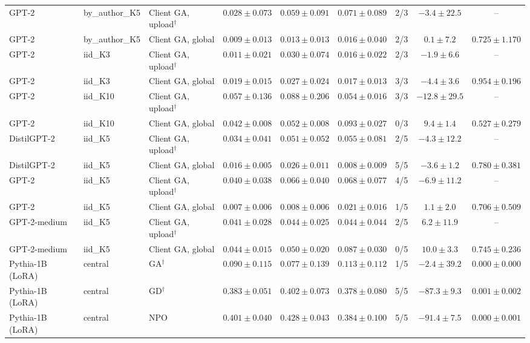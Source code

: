 \begin{table}[t]
\begin{tabular*}{\textwidth}{@{\extracolsep{\fill}}lllcccccc@{}}
GPT-2 & by\_author\_K5 & Client GA, upload$^{\dagger}$ & $0.028 \pm 0.073$ & $0.059 \pm 0.091$ & $0.071 \pm 0.089$ & 2/3 & $-3.4 \pm 22.5$ & -- \\
GPT-2 & by\_author\_K5 & Client GA, global & $0.009 \pm 0.013$ & $0.013 \pm 0.013$ & $0.016 \pm 0.040$ & 2/3 & $0.1 \pm 7.2$ & $0.725 \pm 1.170$ \\
GPT-2 & iid\_K3 & Client GA, upload$^{\dagger}$ & $0.011 \pm 0.021$ & $0.030 \pm 0.074$ & $0.016 \pm 0.022$ & 2/3 & $-1.9 \pm 6.6$ & -- \\
GPT-2 & iid\_K3 & Client GA, global & $0.019 \pm 0.015$ & $0.027 \pm 0.024$ & $0.017 \pm 0.013$ & 3/3 & $-4.4 \pm 3.6$ & $0.954 \pm 0.196$ \\
GPT-2 & iid\_K10 & Client GA, upload$^{\dagger}$ & $0.057 \pm 0.136$ & $0.088 \pm 0.206$ & $0.054 \pm 0.016$ & 3/3 & $-12.8 \pm 29.5$ & -- \\
GPT-2 & iid\_K10 & Client GA, global & $0.042 \pm 0.008$ & $0.052 \pm 0.008$ & $0.093 \pm 0.027$ & 0/3 & $9.4 \pm 1.4$ & $0.527 \pm 0.279$ \\
DistilGPT-2 & iid\_K5 & Client GA, upload$^{\dagger}$ & $0.034 \pm 0.041$ & $0.051 \pm 0.052$ & $0.055 \pm 0.081$ & 2/5 & $-4.3 \pm 12.2$ & -- \\
DistilGPT-2 & iid\_K5 & Client GA, global & $0.016 \pm 0.005$ & $0.026 \pm 0.011$ & $0.008 \pm 0.009$ & 5/5 & $-3.6 \pm 1.2$ & $0.780 \pm 0.381$ \\
GPT-2 & iid\_K5 & Client GA, upload$^{\dagger}$ & $0.040 \pm 0.038$ & $0.066 \pm 0.040$ & $0.068 \pm 0.077$ & 4/5 & $-6.9 \pm 11.2$ & -- \\
GPT-2 & iid\_K5 & Client GA, global & $0.007 \pm 0.006$ & $0.008 \pm 0.006$ & $0.021 \pm 0.016$ & 1/5 & $1.1 \pm 2.0$ & $0.706 \pm 0.509$ \\
GPT-2-medium & iid\_K5 & Client GA, upload$^{\dagger}$ & $0.041 \pm 0.028$ & $0.044 \pm 0.025$ & $0.044 \pm 0.044$ & 2/5 & $6.2 \pm 11.9$ & -- \\
GPT-2-medium & iid\_K5 & Client GA, global & $0.044 \pm 0.015$ & $0.050 \pm 0.020$ & $0.087 \pm 0.030$ & 0/5 & $10.0 \pm 3.3$ & $0.745 \pm 0.236$ \\
Pythia-1B (LoRA) & central & GA$^{\dagger}$ & $0.090 \pm 0.115$ & $0.077 \pm 0.139$ & $0.113 \pm 0.112$ & 1/5 & $-2.4 \pm 39.2$ & $0.000 \pm 0.000$ \\
Pythia-1B (LoRA) & central & GD$^{\dagger}$ & $0.383 \pm 0.051$ & $0.402 \pm 0.073$ & $0.378 \pm 0.080$ & 5/5 & $-87.3 \pm 9.3$ & $0.001 \pm 0.002$ \\
Pythia-1B (LoRA) & central & NPO & $0.401 \pm 0.040$ & $0.428 \pm 0.043$ & $0.384 \pm 0.100$ & 5/5 & $-91.4 \pm 7.5$ & $0.000 \pm 0.001$ \\
\bottomrule
\end{tabular*}


\end{table}
